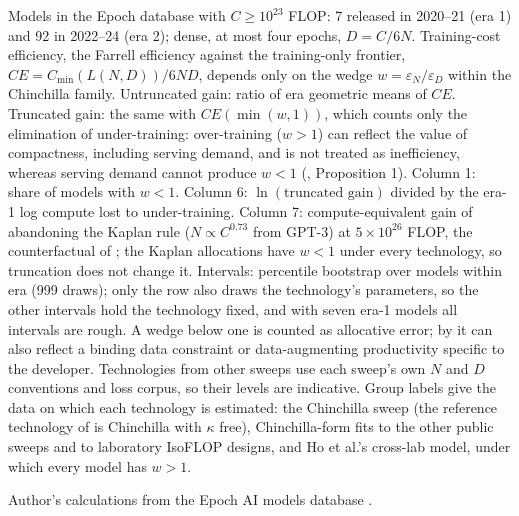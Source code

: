 \begin{table}[tp]
\begin{tablenotes}
Models in the Epoch database with $C\geq10^{23}$ FLOP: 7 released in 2020--21 (era 1) and 92 in 2022--24 (era 2); dense, at most four epochs, $D=C/6N$. Training-cost efficiency, the Farrell efficiency against the training-only frontier, $CE=C_{\min}(L(N,D))/6ND$, depends only on the wedge $w=\varepsilon_N/\varepsilon_D$ within the Chinchilla family. Untruncated gain: ratio of era geometric means of $CE$. Truncated gain: the same with $CE(\min(w,1))$, which counts only the elimination of under-training: over-training ($w>1$) can reflect the value of compactness, including serving demand, and is not treated as inefficiency, whereas serving demand cannot produce $w<1$ (\citealp{okar2026what}, Proposition 1). Column 1: share of models with $w<1$. Column 6: $\ln(\text{truncated gain})$ divided by the era-1 log compute lost to under-training. Column 7: compute-equivalent gain of abandoning the Kaplan rule ($N\propto C^{0.73}$ from GPT-3) at $5\times10^{26}$ FLOP, the counterfactual of \citet{gundlach2025origin}; the Kaplan allocations have $w<1$ under every technology, so truncation does not change it. Intervals: percentile bootstrap over models within era (999 draws); only the \citet{besiroglu2024chinchilla} row also draws the technology's parameters, so the other intervals hold the technology fixed, and with seven era-1 models all intervals are rough. A wedge below one is counted as allocative error; by \citet[Proposition 1]{okar2026what} it can also reflect a binding data constraint or data-augmenting productivity specific to the developer. Technologies from other sweeps use each sweep's own $N$ and $D$ conventions and loss corpus, so their levels are indicative. Group labels give the data on which each technology is estimated: the Chinchilla sweep (the reference technology of \citealp{okar2026what} is Chinchilla with $\kappa$ free), Chinchilla-form fits to the other public sweeps and to laboratory IsoFLOP designs, and Ho et al.'s cross-lab model, under which every model has $w>1$.
\end{tablenotes}
\begin{tablenotes}[Source]
Author's calculations from the Epoch AI models database \citep{epochai2026data}.
\end{tablenotes}
\end{table}
